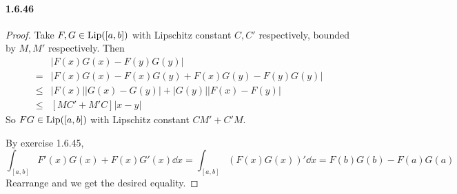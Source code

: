 \documentclass{article}
\begin{document}
\paragraph{1.6.46}
\begin{proof}
Take $F,G\in\mathrm{Lip}([a,b])$ with Lipschitz constant $C,C'$ respectively, bounded by $M,M'$ respectively. Then 
\[\begin{aligned}
&|F(x)G(x)-F(y)G(y)|\\
=&|F(x)G(x)-F(x)G(y)+F(x)G(y)-F(y)G(y)|\\
\leq&|F(x)||G(x)-G(y)|+|G(y)||F(x)-F(y)|\\
\leq&[MC'+M'C]|x-y|
\end{aligned}\] 
So $FG\in\mathrm{Lip}([a,b])$ with Lipschitz constant $CM'+C'M$. 

By exercise 1.6.45, 
\[\int_{[a,b]}F'(x)G(x)+F(x)G'(x)\dd x=\int_{[a,b]}(F(x)G(x))'\dd x=F(b)G(b)-F(a)G(a)\]
Rearrange and we get the desired equality.
\end{proof}
\end{document}

